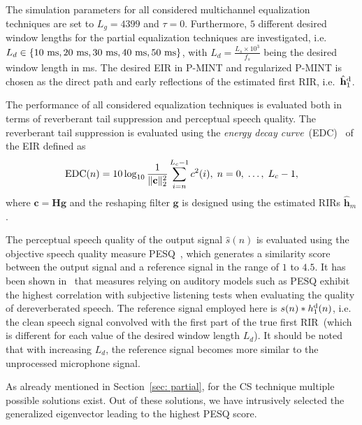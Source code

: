 \documentclass[10pt]{IEEEtran}
\begin{document}
The simulation parameters for all considered multichannel equalization techniques are set to  $L_g = 4399$ and $\tau = 0$.
Furthermore, $5$ different desired window lengths for the partial equalization techniques are investigated, i.e. $L_d \in \{ 10~{\rm ms}, 20~{\rm ms}, 30~{\rm ms}, 40~{\rm ms}, 50~{\rm ms} \}$, with $L_d = \frac{L_s \times 10^3}{f_s}$ being the desired window length in ms.
The desired EIR in P-MINT and regularized P-MINT is chosen as the direct path and early reflections of the estimated first RIR, i.e.~$\hat{\mathbf{h}}_1^{\rm d}$.

The performance of all considered equalization techniques is evaluated both in terms of reverberant tail suppression and perceptual speech quality.
The reverberant tail suppression is evaluated using the \emph{energy decay curve}~(EDC)~\cite{Naylor_Derev_book} of the EIR defined as
\begin{equation}
{\rm EDC}(n) = 10 \log_{10} \frac{1}{\|\mathbf{c}\|_2^2} \sum_{i = n}^{L_c-1} c^2(i), \; n =0, \; \ldots, \; L_c-1,
\end{equation}
where $\mathbf{c} = \mathbf{H}\mathbf{g}$ and the reshaping filter $\mathbf{g}$ is designed using the estimated RIRs $\hat{\mathbf{h}}_m$.

The perceptual speech quality of the output signal $\hat{s}(n)$ is evaluated using the objective speech quality measure PESQ~\cite{PESQ}, which generates a similarity score between the output signal and a reference signal in the range of $1$ to $4.5$.
It has been shown in~\cite{Goetze_AES_2010} that measures relying on auditory models such as PESQ exhibit the highest correlation with subjective listening tests when evaluating the quality of dereverberated speech.
The reference signal employed here is $s(n) \ast h_1^{\rm d}(n)$, i.e. the clean speech signal convolved with the first part of the true first RIR~(which is different for each value of the desired window length $L_d$).
It should be noted that with increasing $L_d$, the reference signal becomes more similar to the unprocessed microphone signal.

As already mentioned in Section~\ref{sec: partial}, for the CS technique multiple possible solutions exist.
Out of these solutions, we have intrusively selected the generalized eigenvector leading to the highest PESQ score.
\end{document}
